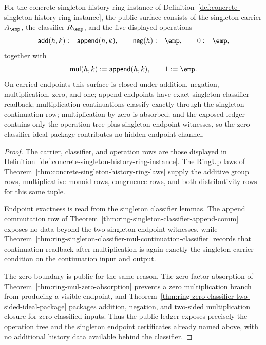 \begin{theorem}
\label{thm:ringup-public-singleton-operation-surface}
For the concrete singleton history ring instance of
Definition~\ref{def:concrete-singleton-history-ring-instance}, the public
surface consists of the singleton carrier $A_{\emp}$, the classifier
$R_{\emp}$, and the five displayed operations
$$
\mathsf{add}(h,k):=\mathsf{append}(h,k),\qquad
\mathsf{neg}(h):=\emp,\qquad
0:=\emp,
$$
together with
$$
\mathsf{mul}(h,k):=\mathsf{append}(h,k),\qquad
1:=\emp.
$$
On carried endpoints this surface is closed under addition, negation,
multiplication, zero, and one; append endpoints have exact singleton
classifier readback; multiplication continuations classify exactly through the
singleton continuation row; multiplication by zero is absorbed; and the exposed
ledger contains only the operation tree plus singleton endpoint witnesses, so
the zero-classifier ideal package contributes no hidden endpoint channel.
\end{theorem}
\begin{proof}
The carrier, classifier, and operation rows are those displayed in
Definition~\ref{def:concrete-singleton-history-ring-instance}. The
RingUp laws of Theorem~\ref{thm:concrete-singleton-history-ring-laws} supply
the additive group rows, multiplicative monoid rows, congruence rows, and both
distributivity rows for this same tuple.

Endpoint exactness is read from the singleton classifier lemmas. The append
commutation row of
Theorem~\ref{thm:ring-singleton-classifier-append-comm} exposes no data beyond
the two singleton endpoint witnesses, while
Theorem~\ref{thm:ring-singleton-classifier-mul-continuation-classifier}
records that continuation readback after multiplication is again exactly the
singleton carrier condition on the continuation input and output.

The zero boundary is public for the same reason. The
zero-factor absorption of Theorem~\ref{thm:ring-mul-zero-absorption} prevents a
zero multiplication branch from producing a visible endpoint, and
Theorem~\ref{thm:ring-zero-classifier-two-sided-ideal-package} packages
addition, negation, and two-sided multiplication closure for zero-classified
inputs. Thus the public ledger exposes precisely the operation tree and the
singleton endpoint certificates already named above, with no additional
history data available behind the classifier.
\end{proof}

